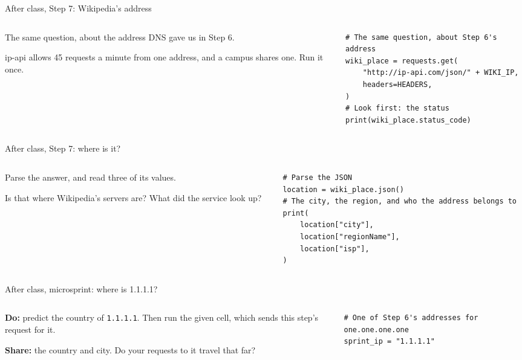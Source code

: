 \documentclass[9pt,aspectratio=169]{beamer}
\begin{document}
\begin{frame}[fragile]{After class, Step 7: Wikipedia's address}
    \begin{columns}[T]
        \begin{column}{0.37\textwidth}
            The same question, about the address DNS gave us in Step 6.

            \medskip
            ip-api allows 45 requests a minute from one address, and a campus shares one. Run it once.
        \end{column}
        \begin{column}{0.6\textwidth}
\begin{lstlisting}[style=lab]
# The same question, about Step 6's address
wiki_place = requests.get(
    "http://ip-api.com/json/" + WIKI_IP,
    headers=HEADERS,
)
# Look first: the status
print(wiki_place.status_code)
\end{lstlisting}
        \end{column}
    \end{columns}
\end{frame}

\begin{frame}[fragile]{After class, Step 7: where is it?}
    \begin{columns}[T]
        \begin{column}{0.37\textwidth}
            Parse the answer, and read three of its values.

            \medskip
            Is that where Wikipedia's servers are? What did the service look up?
        \end{column}
        \begin{column}{0.6\textwidth}
\begin{lstlisting}[style=lab]
# Parse the JSON
location = wiki_place.json()
# The city, the region, and who the address belongs to
print(
    location["city"],
    location["regionName"],
    location["isp"],
)
\end{lstlisting}
        \end{column}
    \end{columns}
\end{frame}

\begin{frame}[fragile]{After class, microsprint: where is 1.1.1.1?}
    \begin{columns}[T]
        \begin{column}{0.37\textwidth}
            \textbf{Do:} predict the country of \texttt{1.1.1.1}. Then run the given cell, which sends this step's request for it.

            \medskip
            \textbf{Share:} the country and city. Do your requests to it travel that far?
        \end{column}
        \begin{column}{0.6\textwidth}
\begin{lstlisting}[style=lab]
# One of Step 6's addresses for one.one.one.one
sprint_ip = "1.1.1.1"
\end{lstlisting}
        \end{column}
    \end{columns}
\end{frame}
\end{document}
